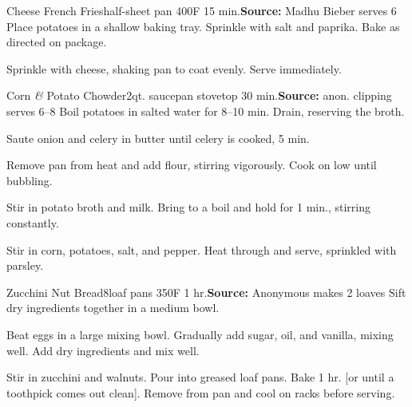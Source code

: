 \begin{recipe}{Cheese French Fries}{half-sheet pan \hfill 400\0F \hfill 15 min.}{\textbf{Source:} Madhu Bieber \hfill serves 6}
 Place potatoes in a shallow baking tray. Sprinkle with salt and paprika. Bake as directed on package.

 Sprinkle with cheese, shaking pan to coat evenly. Serve immediately.
\end{recipe}

\begin{recipe}{Corn \textit{\&} Potato Chowder}{2qt. saucepan \hfill stovetop \hfill 30 min.}{\textbf{Source:} anon. clipping \hfill serves 6--8}
 Boil potatoes in salted water for 8--10 min. Drain, reserving the broth.

 Saute onion and celery in butter until celery is cooked, 5 min.

 Remove pan from heat and add flour, stirring vigorously. Cook on low until bubbling.

 Stir in potato broth and milk. Bring to a boil and hold for 1 min., stirring constantly.

 Stir in corn, potatoes, salt, and pepper. Heat through and serve, sprinkled with parsley.
\end{recipe}

\begin{recipe}{Zucchini Nut Bread}{8\inch{}\inch loaf pans \hfill 350\0F \hfill 1 hr.}{\textbf{Source:} Anonymous \hfill makes 2 loaves}
 Sift dry ingredients together in a medium bowl.

 Beat eggs in a large mixing bowl. Gradually add sugar, oil, and vanilla, mixing well. Add dry ingredients and mix well.

 Stir in zucchini and walnuts. Pour into greased loaf pans. Bake 1 hr. [or until a toothpick comes out clean]. Remove from pan and cool on racks before serving.
\end{recipe}

